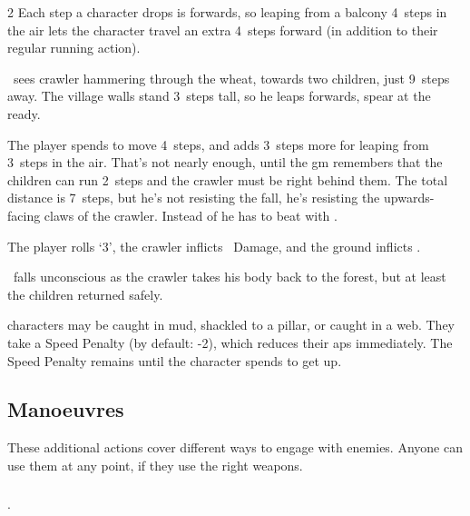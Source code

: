\begin{multicols}{2}
Each \gls{step} a character drops is  forwards, so leaping from a balcony 4~\glspl{step} in the air lets the character travel an extra 4~\glspl{step} forward (in addition to their regular \gls{running} action).

\begin{exampletext}
  \composeHumanName\ sees \gls{crawler} hammering through the wheat, towards two children, just 9~\glspl{step} away.
  The \gls{village} walls stand 3~\glspl{step} tall, so he leaps forwards, spear at the ready.

  {\sffamily
    The player spends  to move 4~\glspl{step}, and adds 3~\glspl{step} more for leaping from 3~\glspl{step} in the air.
    That's not nearly enough, until the \gls{gm} remembers that the children can run 2~\glspl{step} and the \gls{crawler} must be right behind them.
    The total distance is 7~\glspl{step}, but he's not resisting the fall, he's resisting the upwards-facing claws of the \gls{crawler}.
    Instead of \tn[6] he has to beat \tn[11] with .

    The player rolls `3', the \gls{crawler} inflicts ~Damage, and the ground inflicts .
  }
  \currentName\ falls unconscious as the \gls{crawler} takes his body back to the forest, but at least the children returned safely.
\end{exampletext}


\label{trapped}
\label{prone}
characters may be caught in mud, shackled to a pillar, or caught in a web.
They take a Speed Penalty (by default: -2), which reduces their \glspl{ap} immediately.
The Speed Penalty remains until the character spends  to get up.

\subsection{Manoeuvres}
\label{manoeuvres}

These additional actions cover different ways to engage with enemies.
Anyone can use them at any point, if they use the right weapons.

\subsubsection{}
.


\end{multicols}
